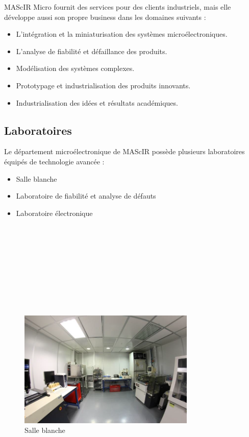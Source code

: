 \documentclass[11pt, a4paper, twoside]{book}
\begin{document}
MAScIR Micro fournit des services pour des clients industriels, mais elle développe aussi son propre business dans les domaines suivants :
\begin{itemize}
\item L’intégration et la miniaturisation des systèmes microélectroniques.
\item L’analyse de fiabilité et défaillance des produits.
\item Modélisation des systèmes complexes.
\item Prototypage et industrialisation des produits innovants.
\item Industrialisation des idées et résultats académiques.
\end{itemize}

\subsection{Laboratoires}
Le département microélectronique de MAScIR possède plusieurs laboratoires équipés de technologie avancée :
\begin{itemize}
\item Salle blanche
\item Laboratoire de fiabilité et analyse de défauts
\item Laboratoire électronique\\\\\\\\\\\\\\\\\\\\
\end{itemize}

\begin{figure}[H]
\centering
\includegraphics[width=0.75\textwidth]{cleanroom}
\caption{Salle blanche}
\end{figure}
\end{document}
